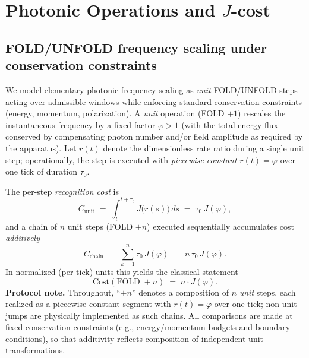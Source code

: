 \documentclass[12pt,a4paper]{article}
\begin{document}
\section{Photonic Operations and $J$-cost}

\subsection{FOLD/UNFOLD frequency scaling under conservation constraints}
We model elementary photonic frequency-scaling as \emph{unit} FOLD/UNFOLD steps acting over admissible windows while enforcing standard conservation constraints (energy, momentum, polarization). A \emph{unit} operation (FOLD $+1$) rescales the instantaneous frequency by a fixed factor $\varphi>1$ (with the total energy flux conserved by compensating photon number and/or field amplitude as required by the apparatus). Let $r(t)$ denote the dimensionless rate ratio during a single unit step; operationally, the step is executed with \emph{piecewise-constant} $r(t)=\varphi$ over one tick of duration $\tau_{0}$.

The per-step \emph{recognition cost} is
\[
  C_{\mathrm{unit}} \;=\; \int_{t}^{t+\tau_{0}} J\!\bigl(r(s)\bigr)\,ds
  \;=\; \tau_{0}\,J(\varphi),
\]
and a chain of $n$ unit steps (FOLD $+n$) executed sequentially accumulates cost \emph{additively}
\[
  C_{\mathrm{chain}} \;=\; \sum_{k=1}^{n} \tau_{0}\,J(\varphi)
  \;=\; n\,\tau_{0}\,J(\varphi).
\]
In normalized (per-tick) units this yields the classical statement
\[
  \mathrm{Cost}(\mathrm{FOLD}\;{+}n)\;=\;n\cdot J(\varphi).
\]
\noindent\textbf{Protocol note.} Throughout, “$+n$” denotes a composition of $n$ \emph{unit} steps, each realized as a piecewise-constant segment with $r(t)=\varphi$ over one tick; non-unit jumps are physically implemented as such chains. All comparisons are made at fixed conservation constraints (e.g., energy/momentum budgets and boundary conditions), so that additivity reflects composition of independent unit transformations.
\end{document}
